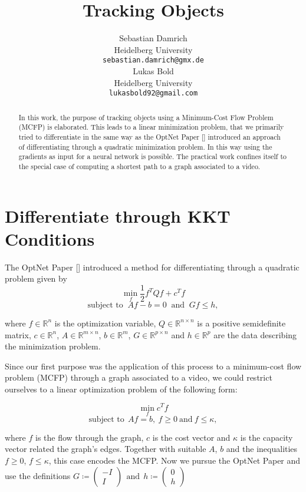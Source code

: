 \documentclass{article}
\title{Tracking Objects}
\author{
	Sebastian Damrich 
    \\
  Heidelberg University\\
  \texttt{sebastian.damrich@gmx.de} \\
   \And
   Lukas Bold  \\
   Heidelberg University \\
  \texttt{lukasbold92@gmail.com} \\
}
\begin{document}

\maketitle

\begin{abstract}
In this work, the purpose of tracking objects using a Minimum-Cost Flow Problem (MCFP) is elaborated. This leads to a linear minimization problem, that we primarily tried to differentiate in the same way as the OptNet Paper [] introduced an approach of differentiating through a quadratic minimization problem. In this way using the gradients as input for a neural network is possible. The practical work confines itself to the special case of computing a shortest path to a graph associated to a video. 
 
\end{abstract}

\section{Differentiate through KKT Conditions}
\label{others}

The OptNet Paper [] introduced a method for differentiating through a quadratic problem given by
\[ \min_f \frac{1}{2} f^T Q f + c^T f \]
\[\text{subject to }~  Af-b=0 ~\text{ and }~ Gf \leq h, \]

where $f\in \mathbb{R}^n$ is the optimization variable, $Q\in \mathbb{R}^{n\times n}$ is a positive semidefinite matrix, $c\in \mathbb{R}^n$, $A\in \mathbb{R}^{m\times n}$, $b\in \mathbb{R}^m$, $G\in \mathbb{R}^{p\times n}$ and $h\in \mathbb{R}^p$ are the data describing the minimization problem. 

Since our first purpose was the application of this process to a minimum-cost flow problem (MCFP) through a graph associated to a video, we could restrict ourselves to a linear optimization problem of the following form:

\[\min_f c^T f\] 
\[ \text{subject to} ~~Af=b,~f\geq 0 ~\text{and}~ f \leq \kappa,\]

where $f$ is the flow through the graph, $c$ is the cost vector and $\kappa$ is the capacity vector related the graph's edges. Together with suitable $A$, $b$ and the inequalities $f\geq 0$, $f\leq \kappa$, this case encodes the MCFP. Now we pursue the OptNet Paper and use the definitions
$G\coloneqq \begin{pmatrix} -I \\  I \end{pmatrix} ~~\text{and} ~~ h\coloneqq \begin{pmatrix} 0 \\ h \end{pmatrix} $
\end{document}
